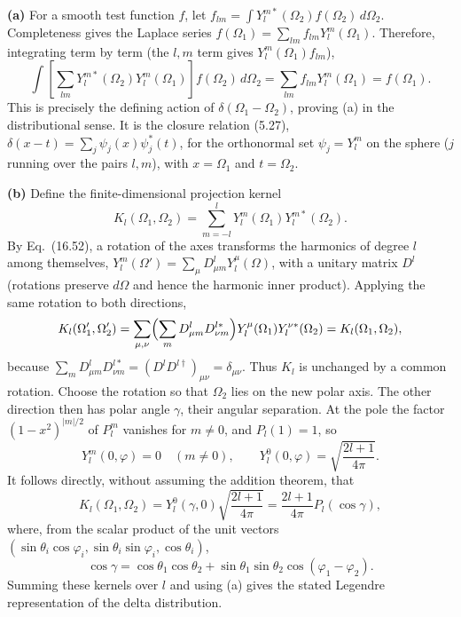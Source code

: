 \textbf{(a)} For a smooth test function $f$, let
$f_{lm}=\int Y_l^{m*}(\Omega_2)f(\Omega_2)\,d\Omega_2$.
Completeness gives the Laplace series
$f(\Omega_1)=\sum_{lm}f_{lm}Y_l^m(\Omega_1)$.
Therefore, integrating term by term (the $l,m$ term gives
$Y_l^m(\Omega_1)f_{lm}$),
\[
\int\left[\sum_{lm}Y_l^{m*}(\Omega_2)Y_l^m(\Omega_1)\right]
f(\Omega_2)\,d\Omega_2
=\sum_{lm}f_{lm}Y_l^m(\Omega_1)=f(\Omega_1).
\]
This is precisely the defining action of
$\delta(\Omega_1-\Omega_2)$, proving (a) in the distributional sense.
It is the closure relation (5.27),
$\delta(x-t)=\sum_j\psi_j(x)\psi_j^*(t)$, for the orthonormal
set $\psi_j=Y_l^m$ on the sphere ($j$ running over the pairs
$l,m$), with $x=\Omega_1$ and $t=\Omega_2$.

\textbf{(b)} Define the finite-dimensional projection kernel
\[
K_l(\Omega_1,\Omega_2)=
\sum_{m=-l}^{l}Y_l^m(\Omega_1)Y_l^{m*}(\Omega_2).
\]
By Eq.~(16.52), a rotation of the axes transforms the harmonics of
degree $l$ among themselves,
$Y_l^m(\Omega')=\sum_\mu D^l_{\mu m}Y_l^\mu(\Omega)$, with a unitary
matrix $D^l$ (rotations preserve $d\Omega$ and hence the harmonic
inner product). Applying the same rotation to both directions,
\[
K_l(\Omega_1',\Omega_2')
=\sum_{\mu,\nu}\Bigl(\sum_mD^l_{\mu m}D^{l*}_{\nu m}\Bigr)
Y_l^\mu(\Omega_1)Y_l^{\nu*}(\Omega_2)
=K_l(\Omega_1,\Omega_2),
\]
because $\sum_mD^l_{\mu m}D^{l*}_{\nu m}=(D^lD^{l\dagger})_{\mu\nu}
=\delta_{\mu\nu}$. Thus $K_l$ is unchanged by a common rotation.
Choose the rotation so that $\Omega_2$ lies on the new polar axis.
The other direction then has polar angle $\gamma$, their angular
separation. At the pole the factor $(1-x^2)^{|m|/2}$ of $P_l^m$
vanishes for $m\ne0$, and $P_l(1)=1$, so
\[
Y_l^m(0,\varphi)=0\quad(m\ne0),\qquad
Y_l^0(0,\varphi)=\sqrt{\frac{2l+1}{4\pi}}.
\]
It follows directly, without assuming the addition theorem, that
\[
K_l(\Omega_1,\Omega_2)
=Y_l^0(\gamma,0)\sqrt{\frac{2l+1}{4\pi}}
=\boxed{\frac{2l+1}{4\pi}P_l(\cos\gamma)},
\]
where, from the scalar product of the unit vectors
$(\sin\theta_i\cos\varphi_i,\sin\theta_i\sin\varphi_i,\cos\theta_i)$,
\[
\cos\gamma=\cos\theta_1\cos\theta_2+
\sin\theta_1\sin\theta_2\cos(\varphi_1-\varphi_2).
\]
Summing these kernels over $l$ and using (a) gives the stated
Legendre representation of the delta distribution.

